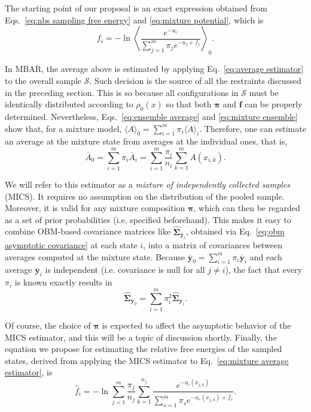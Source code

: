 \documentclass[journal=jctcce,manuscript=article,layout=twocolumn]{achemso}
\newcommand{\mt}[1]{\boldsymbol{\mathbf{#1}}}   %
\newcommand{\vt}[1]{\boldsymbol{\mathbf{#1}}}   %
\newcommand{\avg}[1]{\overline{#1}}             %
\begin{document}
The starting point of our proposal is an exact expression obtained from Eqs.~\eqref{eq:nbs sampling free energy} and \eqref{eq:mixture potential}, which is
\begin{equation}
\label{eq:free energy exact}
f_i = -\ln \left\langle \frac{e^{-u_i}}{\sum_{j=1}^m \pi_j e^{-u_j + f_j}} \right\rangle_0.
\end{equation}

In MBAR, the average above is estimated by applying Eq.~\eqref{eq:average estimator} to the overall sample $\mathcal S$. Such decision is the source of all the restraints discussed in the preceding section. This is so because all configurations in $\mathcal S$ must be identically distributed according to $\rho_0(x)$ so that both $\vt \pi$ and $\vt f$ can be properly determined. Nevertheless, Eqs.~\eqref{eq:ensemble average} and \eqref{eq:mixture ensemble} show that, for a mixture model, $\langle A \rangle_0 = \sum_{i=1}^m \pi_i \langle A \rangle_i$. Therefore, one can estimate an average at the mixture state from averages at the individual ones, that is,
\begin{equation}
\label{eq:mixture average estimator}
{\avg A}_0 = \sum_{i=1}^m \pi_i \avg{A}_i = \sum_{i=1}^m \frac{\pi_i}{n_i} \sum_{k=1}^m A(x_{i,k}).
\end{equation}

We will refer to this estimator as a \textit{mixture of independently collected samples} (MICS). It requires no assumption on the distribution of the pooled sample. Moreover, it is valid for any mixture composition $\vt \pi$, which can then be regarded as a set of prior probabilities (i.e. specified beforehand). This makes it easy to combine OBM-based covariance matrices like $\hat{\mt \Sigma}_{\avg{\vt y}_i}$, obtained via Eq.~\eqref{eq:obm asymptotic covariance} at each state $i$, into a matrix of covariances between averages computed at the mixture state. Because $\avg{\vt y}_0 = \sum_{i=1}^m \pi_i \avg{\vt y}_i$ and each average $\avg{\vt y}_i$ is independent (i.e. covariance is null for all $j \neq i$), the fact that every $\pi_i$ is known exactly results in
\begin{equation}
\label{eq:mixture variance estimator}
\hat{\mt \Sigma}_{\avg{\vt y}_0} = \sum_{i=1}^m \pi_i^2 \hat{\mt \Sigma}_{\avg{\vt y}_i}.
\end{equation}

Of course, the choice of $\vt \pi$ is expected to affect the asymptotic behavior of the MICS estimator, and this will be a topic of discussion shortly. Finally, the equation we propose for estimating the relative free energies of the sampled states, derived from applying the MICS estimator to Eq.~\eqref{eq:mixture average estimator}, is
\begin{equation}
\label{eq:mblock free energy estimator}
{\hat f}_i = -\ln \sum_{j=1}^m \frac{\pi_j}{n_j} \sum_{k=1}^{n_j} \frac{e^{-u_i(x_{j,k})}}{\sum_{s=1}^m \pi_s e^{-u_s(x_{j,k}) + {\hat f}_s}}.
\end{equation}
\end{document}

